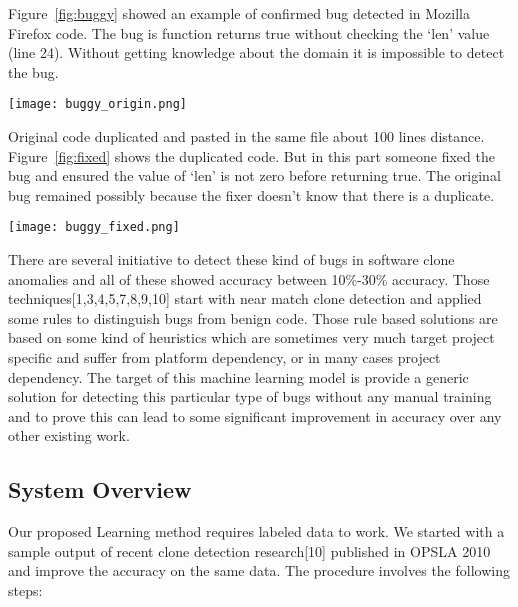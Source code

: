 \documentclass[nocopyrightspace]{sigplanconf}
\begin{document}
\vspace{10 pt}
\noindent
Figure~\ref{fig:buggy} showed an example of confirmed bug detected in Mozilla Firefox code. The bug is function returns true without checking the ‘len’ value (line 24). Without getting knowledge about the domain it is impossible to detect the bug.

\begin{figure*}[t!]
\centering
\texttt{[image: buggy\_origin.png]}
\caption{Buggy copy of the clone}
\label{fig:buggy}
\end{figure*}

\vspace{10 pt}
\noindent
Original code duplicated and pasted in the same file about 100 lines distance. Figure~\ref{fig:fixed} shows the duplicated code. But in this part someone fixed the bug and ensured the value of ‘len’ is not zero before returning true. The original bug remained possibly because the fixer doesn’t know that there is a duplicate.

\begin{figure*}[t!]
\centering
\texttt{[image: buggy\_fixed.png]}
\caption{Fixed copy of the clone}
\label{fig:fixed}
\end{figure*}

\vspace{10 pt}
\noindent
There are several initiative to detect these kind of bugs in software clone anomalies and all of these showed accuracy between 10\%-30\% accuracy. Those techniques[1,3,4,5,7,8,9,10] start with near match clone detection and applied some rules to distinguish bugs from benign code. Those rule based solutions are based on some kind of heuristics which are sometimes very much target project specific and suffer from platform dependency, or in many cases project dependency. The target of this machine learning model is provide a generic solution for detecting this particular type of bugs without any manual training and to prove this can lead to some significant improvement in accuracy over any other existing work.

\subsection{System Overview}
Our proposed Learning method requires labeled data to work. We started with a sample output of recent clone detection research[10] published in OPSLA 2010 and improve the accuracy on the same data. The procedure involves the following steps:
\end{document}
